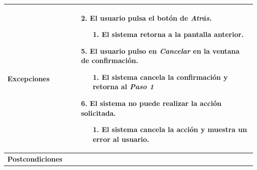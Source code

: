 \begin{longtable}{| p{4cm} | p{10cm} |}
\\
\hline
\textbf{Excepciones} &\mbox{}\par\vspace{-\baselineskip}
\begin{enumerate}[leftmargin=0.9cm, topsep=0.1cm]
\item[2.] El usuario pulsa el botón de \textit{Atrás}.
	\begin{itemize}
	\item[1.] El sistema retorna a la pantalla anterior.
	\end{itemize}
\item[5.] El usuario pulso en \textit{Cancelar} en la ventana de confirmación.
	\begin{itemize}
	\item[1.] El sistema cancela la confirmación y retorna al \textit{Paso 1}
	\end{itemize}
\item[6.] El sistema no puede realizar la acción solicitada.
	\begin{itemize}
	\item[1.] El sistema cancela la acción y muestra un error al usuario.
	\end{itemize}
\end{enumerate}
\\

\hline
\textbf{Postcondiciones} & \\
\hline
\end{longtable}



\newpage
